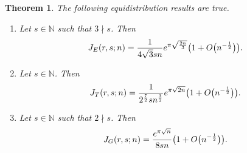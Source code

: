 \documentclass[10pt,a4paper]{amsart}
\newcommand{\N}{\mathbb{N}}
\numberwithin{equation}{section}
\newtheorem{Theorem}{Theorem}[section]
\begin{document}
\begin{Theorem}\label{thm: main}
	The following equidistribution results are true.
	\begin{enumerate}
		\item[$(1)$] Let $s \in \N$ such that $3 \nmid s$. Then
		\begin{align*}
			J_E(r,s;n) = \frac{1}{4 \sqrt{3} s n}{\rm e}^{\pi \sqrt{\frac{2n}{3}}} \big(1+O\big(n^{-\frac{1}{2}}\big)\big).
		\end{align*}
		
		\item[$(2)$] Let $s \in \N$. Then
		\begin{align*}
			J_T(r,s;n) = \frac{1}{2^{\frac{7}{2}} s n^{\frac{3}{2}}} {\rm e}^{\pi\sqrt{2n}} \big(1+O\big(n^{-\frac{1}{2}}\big)\big).
		\end{align*}
		
		\item[$(3)$] Let $s\in \N$ such that $2 \nmid s$. Then
		\begin{align*}
			J_G(r,s;n) = \frac{{\rm e}^{\pi \sqrt{n}}}{8sn} \big(1+O\big(n^{-\frac{1}{2}}\big)\big).
		\end{align*}
	\end{enumerate}
\end{Theorem}
\end{document}
